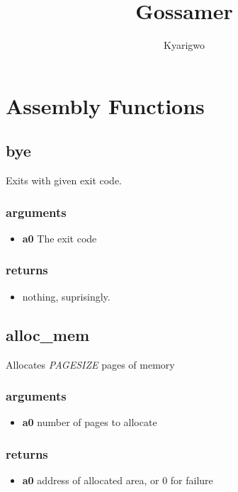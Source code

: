 \documentclass{article}
\author{Kyarigwo}
\title{Gossamer}
\begin{document}
\section{Assembly Functions}

\subsection*{bye}

Exits with given exit code.

\subsubsection*{arguments}

\begin{itemize}
  \item \textbf{a0} The exit code
\end{itemize}

\subsubsection*{returns}

\begin{itemize}
  \item nothing, suprisingly.
\end{itemize}

\subsection*{alloc\_mem}
Allocates \emph{PAGESIZE} pages of memory

\subsubsection*{arguments}

\begin{itemize}
  \item \textbf{a0} number of pages to allocate
\end{itemize}

\subsubsection*{returns}

\begin{itemize}
  \item \textbf{a0} address of allocated area, or 0 for failure
\end{itemize}
\end{document}
